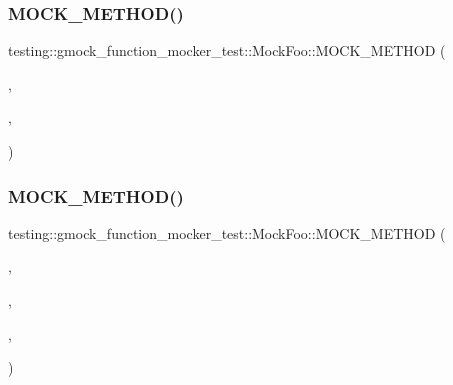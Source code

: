\mbox{\label{classtesting_1_1gmock__function__mocker__test_1_1_mock_foo_ae7680c58ebcf5f91c5f190043528b313}} 
\subsubsection{\texorpdfstring{MOCK\_METHOD()}{MOCK\_METHOD()}\hspace{0.1cm}{\footnotesize\ttfamily [28/38]}}
{\footnotesize\ttfamily testing\+::gmock\+\_\+function\+\_\+mocker\+\_\+test\+::\+Mock\+Foo\+::\+M\+O\+C\+K\+\_\+\+M\+E\+T\+H\+OD (\begin{DoxyParamCaption}\item[{char}]{,  }\item[{\mbox{\hyperlink{classtesting_1_1gmock__function__mocker__test_1_1_foo_interface_a78fc84ae56ba53a36047f0791d03fc58}{Overloaded\+On\+Argument\+Type}}}]{,  }\item[{(char)}]{ }\end{DoxyParamCaption})}

\mbox{\label{classtesting_1_1gmock__function__mocker__test_1_1_mock_foo_a57a7faaeec9d76031292fa532c35c0c6}} 
\subsubsection{\texorpdfstring{MOCK\_METHOD()}{MOCK\_METHOD()}\hspace{0.1cm}{\footnotesize\ttfamily [29/38]}}
{\footnotesize\ttfamily testing\+::gmock\+\_\+function\+\_\+mocker\+\_\+test\+::\+Mock\+Foo\+::\+M\+O\+C\+K\+\_\+\+M\+E\+T\+H\+OD (\begin{DoxyParamCaption}\item[{int}]{,  }\item[{\mbox{\hyperlink{classtesting_1_1gmock__function__mocker__test_1_1_foo_interface_a94e43dbddc176d1702a7a7d7281f2642}{Overloaded\+On\+Constness}}}]{,  }\item[{()}]{,  }\item[{(override)}]{ }\end{DoxyParamCaption})}

